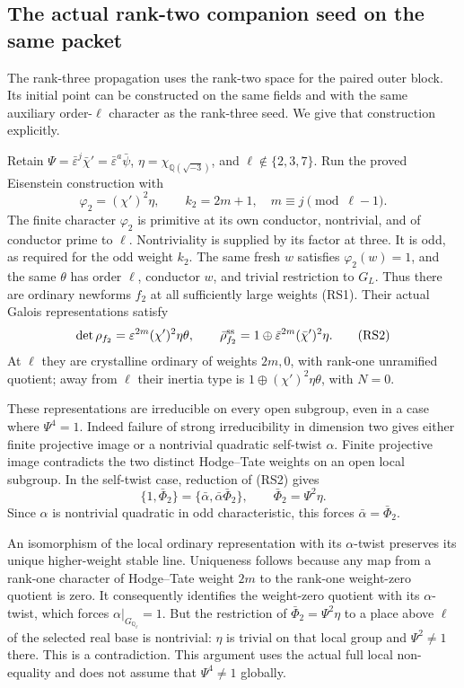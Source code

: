 \subsection{The actual rank-two companion seed on the same packet}
\label{subsec:generic-rank-two-companion}

The rank-three propagation uses the rank-two space
for the paired outer block.
Its initial point can be constructed on the same
fields and with the same auxiliary order-\(\ell\)
character as the rank-three seed.
We give that construction explicitly.

Retain
\(\Psi=\bar\varepsilon^j\bar\chi'
 =\bar\varepsilon^a\bar\psi\),
\(\eta=\chi_{\mathbb Q(\sqrt{-3})}\),
and \(\ell\notin\{2,3,7\}\).
Run the proved Eisenstein construction with
\[
                    \varphi_2=(\chi')^2\eta,
                         \qquad k_2=2m+1,\quad
                            m\equiv j\pmod{\ell-1}.           \tag{RS1}
\]
The finite character \(\varphi_2\) is primitive at
its own conductor, nontrivial, and of conductor
prime to \(\ell\).
Nontriviality is supplied by its factor at three.
It is odd, as required for the odd weight \(k_2\).
The same fresh \(w\) satisfies
\(\varphi_2(w)=1\), and the same \(\theta\)
has order \(\ell\), conductor \(w\), and trivial
restriction to \(G_L\).
Thus there are ordinary newforms \(f_2\) at all
sufficiently large weights (RS1).
Their actual Galois representations satisfy
\[
 \det\rho_{f_2}=\varepsilon^{2m}(\chi')^2\eta\theta,
 \qquad
 \bar\rho_{f_2}^{\rm ss}
                =1\oplus\bar\varepsilon^{2m}(\bar\chi')^2\eta .
                                                               \tag{RS2}
\]
At \(\ell\) they are crystalline ordinary of
weights \(2m,0\), with rank-one unramified
quotient; away from \(\ell\) their inertia type
is \(1\oplus(\chi')^2\eta\theta\), with \(N=0\).

These representations are irreducible on every
open subgroup, even in a case where
\(\Psi^4=1\).
Indeed failure of strong irreducibility in
dimension two gives either finite projective
image or a nontrivial quadratic self-twist
\(\alpha\).
Finite projective image contradicts the two
distinct Hodge--Tate weights on an open local
subgroup.
In the self-twist case, reduction of (RS2)
gives
\[
 \{1,\bar\Phi_2\}
          =\{\bar\alpha,\bar\alpha\bar\Phi_2\},
       \qquad\bar\Phi_2=\Psi^2\eta .
\]
Since \(\alpha\) is nontrivial quadratic in
odd characteristic, this forces
\(\bar\alpha=\bar\Phi_2\).

An isomorphism of the local ordinary
representation with its \(\alpha\)-twist
preserves its unique higher-weight stable line.
Uniqueness follows because any map from a
rank-one character of Hodge--Tate weight \(2m\)
to the rank-one weight-zero quotient is zero.
It consequently identifies the weight-zero
quotient with its \(\alpha\)-twist, which
forces \(\alpha|_{G_{\mathbb Q_\ell}}=1\).
But the restriction of
\(\bar\Phi_2=\Psi^2\eta\) to a place above
\(\ell\) of the selected real base is nontrivial:
\(\eta\) is trivial on that local group and
\(\Psi^2\ne1\) there.
This is a contradiction.
This argument uses the actual full local
non-equality and does not assume that
\(\Psi^4\ne1\) globally.

